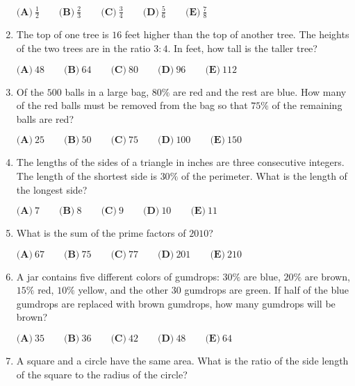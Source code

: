 \documentclass{article}
\begin{document}
\begin{enumerate}[label=\arabic*., itemsep=0.5em]
\( \textbf{(A)}\ \frac 12 \qquad\textbf{(B)}\ \frac 23 \qquad\textbf{(C)}\ \frac 34 \qquad\textbf{(D)}\ \frac 56 \qquad\textbf{(E)}\ \frac 78 \)\par \vspace{0.5em}\item The top of one tree is \(16\) feet higher than the top of another tree. The heights of the two trees are in the ratio \(3:4\). In feet, how tall is the taller tree? 

\( \textbf{(A)}\ 48 \qquad\textbf{(B)}\ 64 \qquad\textbf{(C)}\ 80 \qquad\textbf{(D)}\ 96\qquad\textbf{(E)}\ 112 \)\par \vspace{0.5em}\item Of the \(500\) balls in a large bag, \(80\%\) are red and the rest are blue. How many of the red balls must be removed from the bag so that \(75\%\) of the remaining balls are red?

\( \textbf{(A)}\ 25 \qquad\textbf{(B)}\ 50 \qquad\textbf{(C)}\ 75 \qquad\textbf{(D)}\ 100\qquad\textbf{(E)}\ 150 \)\par \vspace{0.5em}\item The lengths of the sides of a triangle in inches are three consecutive integers. The length of the shortest side is \(30\%\) of the perimeter. What is the length of the longest side?

\( \textbf{(A)}\ 7 \qquad\textbf{(B)}\ 8\qquad\textbf{(C)}\ 9\qquad\textbf{(D)}\ 10\qquad\textbf{(E)}\ 11 \)\par \vspace{0.5em}\item What is the sum of the prime factors of \(2010\)? 

\( \textbf{(A)}\ 67 \qquad\textbf{(B)}\ 75\qquad\textbf{(C)}\ 77\qquad\textbf{(D)}\ 201\qquad\textbf{(E)}\ 210 \)\par \vspace{0.5em}\item A jar contains five different colors of gumdrops: \(30\%\) are blue, \(20\%\) are brown, \(15\%\) red, \(10\%\) yellow, and the other \(30\) gumdrops are green. If half of the blue gumdrops are replaced with brown gumdrops, how many gumdrops will be brown?

\( \textbf{(A)}\ 35 \qquad\textbf{(B)}\ 36\qquad\textbf{(C)}\ 42\qquad\textbf{(D)}\ 48\qquad\textbf{(E)}\ 64 \)\par \vspace{0.5em}\item A square and a circle have the same area. What is the ratio of the side length of the square to the radius of the circle? 


\end{enumerate}
\end{document}
